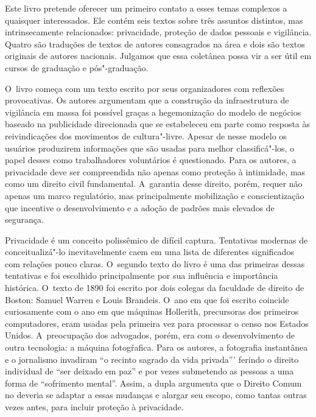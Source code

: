 Este livro pretende oferecer um primeiro contato a esses temas complexos
a quaisquer interessados. Ele contém seis textos sobre três assuntos
distintos, mas intrinsecamente relacionados: privacidade, proteção de
dados pessoais e vigilância. Quatro são traduções de textos de autores
consagrados na área e dois são textos originais de autores nacionais.
Julgamos que essa coletânea possa vir a ser útil em cursos de graduação
e pós"-graduação.

O~livro começa com um texto escrito por seus organizadores com reflexões
provocativas. Os autores argumentam que a construção da infraestrutura
de vigilância em massa foi possível graças a hegemonização do modelo de
negócios baseado na publicidade direcionada que se estabeleceu em parte
como resposta às reivindicações dos movimentos de cultura"-livre. Apesar
de nesse modelo os usuários produzirem informações que são usadas para
melhor classificá"-los, o papel desses como trabalhadores voluntários é
questionado. Para os autores, a privacidade deve ser compreendida não
apenas como proteção à intimidade, mas como um direito civil
fundamental. A~garantia desse direito, porém, requer não apenas um marco
regulatório, mas principalmente mobilização e conscientização que
incentive o desenvolvimento e a adoção de padrões mais elevados de
segurança.

Privacidade é um conceito polissêmico de difícil captura. Tentativas
modernas de conceitualizá"-lo inevitavelmente caem em uma lista de
diferentes significados com relações pouco claras. O~segundo texto do
livro é uma das primeiras dessas tentativas e foi escolhido
principalmente por sua influência e importância histórica. O~texto de
1890 foi escrito por dois colegas da faculdade de direito de Boston:
Samuel Warren e Louis Brandeis. O~ano em que foi escrito coincide
curiosamente com o ano em que máquinas Hollerith, precursoras dos
primeiros computadores, eram usadas pela primeira vez para processar o
censo nos Estados Unidos. A~preocupação dos advogados, porém, era com o
desenvolvimento de outra tecnologia: a máquina fotogŕafica. Para os
autores, a fotografia instantânea e o jornalismo invadiram ``o recinto
sagrado da vida privada''' ferindo o direito individual de ``ser deixado
em paz'' e por vezes submetendo as pessoas a uma forma de ``sofrimento
mental''. Assim, a dupla argumenta que o Direito Comum no  deveria se
adaptar a essas mudanças e alargar seu escopo, como tantas outras vezes
antes, para incluir proteção à privacidade.

